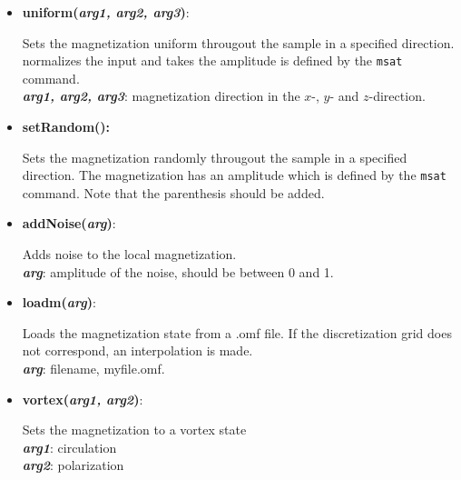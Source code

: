 \begin{itemize}
 \item  {\textbf{uniform(\textit{arg1, arg2, arg3})}:
				\flushright\parbox{0.9 \textwidth}{\vspace{-0.25cm} 
				Sets the magnetization uniform througout the sample in a specified direction.  \mumax normalizes the input and takes the amplitude is defined by the \texttt{msat} command.\\
				\textbf{\textit{arg1, arg2, arg3}}: magnetization direction in the $x$-, $y$- and $z$-direction.
				}\flushleft}

 \item {\vspace{-0.4cm}\textbf{setRandom():}
				\flushright\parbox{0.9 \textwidth}{\vspace{-0.25cm} 
				Sets the magnetization randomly througout the sample in a specified direction.  The magnetization has an amplitude which is defined by the \texttt{msat} command.  Note that the parenthesis should be added.
				}\flushleft}

 \item {\vspace{-0.4cm}\textbf{addNoise(\textit{arg})}:
				\flushright\parbox{0.9 \textwidth}{\vspace{-0.25cm} 
				Adds noise to the local magnetization. \\
				\textbf{\textit{arg}}: amplitude of the noise, should be between 0 and 1.
				}\flushleft}

 \item {\vspace{-0.4cm}\textbf{loadm(\textit{arg})}:
				\flushright\parbox{0.9 \textwidth}{\vspace{-0.25cm} 
				Loads the magnetization state from a .omf file.  If the discretization grid does not correspond, an interpolation is made.\\
				\textbf{\textit{arg}}: filename, myfile.omf.
				}\flushleft}

 \item {\vspace{-0.4cm}\textbf{vortex(\textit{arg1, arg2})}:
				\flushright\parbox{0.9 \textwidth}{\vspace{-0.25cm} 
				Sets the magnetization to a vortex state\\
				\textbf{\textit{arg1}}: circulation\\
				\textbf{\textit{arg2}}: polarization
				}\flushleft}


\end{itemize}
